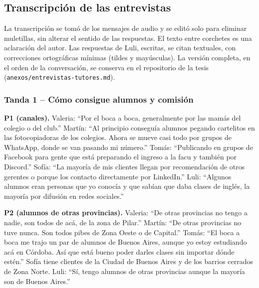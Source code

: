 \subsection{Transcripción de las entrevistas}

La transcripción se tomó de los mensajes de audio y se editó solo para
eliminar muletillas, sin alterar el sentido de las respuestas. El texto
entre corchetes es una aclaración del autor. Las respuestas de Luli,
escritas, se citan textuales, con correcciones ortográficas mínimas
(tildes y mayúsculas). La versión completa, en el
orden de la conversación, se conserva en el repositorio de la tesis
(\texttt{anexos/entrevistas-tutores.md}).

\subsubsection*{Tanda 1 -- Cómo consigue alumnos y comisión}

\textbf{P1 (canales).} Valeria: ``Por el boca a boca, generalmente por
las mamás del colegio o del club.'' Martín: ``Al principio conseguía
alumnos pegando cartelitos en las fotocopiadoras de los colegios. Ahora
se mueve casi todo por grupos de WhatsApp, donde se van pasando mi
número.'' Tomás: ``Publicando en grupos de Facebook para gente que está
preparando el ingreso a la facu y también por Discord.'' Sofía: ``La
mayoría de mis clientes llegan por recomendación de otros gerentes o
porque los contacto directamente por LinkedIn.'' Luli: ``Algunos
alumnos eran personas que yo conocía y que sabían que daba clases de
inglés, la mayoría por difusión en redes sociales.''

\textbf{P2 (alumnos de otras provincias).} Valeria: ``De otras provincias
no tengo a nadie, son todos de acá, de la zona de Pilar.'' Martín: ``De
otras provincias no tuve nunca. Son todos pibes de Zona Oeste o de
Capital.'' Tomás: ``El boca a boca me trajo un par de alumnos de Buenos
Aires, aunque yo estoy estudiando acá en Córdoba. Así que está bueno
poder darles clases sin importar dónde estén.'' Sofía tiene clientes de
la Ciudad de Buenos Aires y de los barrios cerrados de Zona Norte. Luli:
``Sí, tengo alumnos de otras provincias aunque la mayoría son de Buenos
Aires.''

